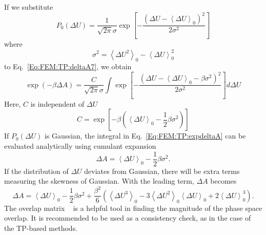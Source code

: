 If we substitute
\begin{equation}
P_{0}(\Delta U) = \frac{1}{\sqrt{2\pi}\sigma}\exp{\left[-\frac{(\Delta U - \left \langle \Delta U \right \rangle_{0})^2}{2\sigma^2}\right]}
\label{Eq:FEM:TP:gaussian}
\end{equation}
where
\begin{equation}
\sigma^2 = \left \langle \Delta U^2 \right \rangle_{0} - \left \langle \Delta U \right \rangle_{0}^2
\label{Eq:FEM:TP:variance}
\end{equation}
to Eq.~\ref{Eq:FEM:TP:deltaA7}, we obtain
\begin{equation}
\exp(-\beta \Delta A) = \frac{C}{\sqrt{2\pi}\sigma} \int \exp{\left[-\frac{(\Delta U - \left \langle \Delta U \right \rangle_{0} - \beta \sigma ^2)^2}{2\sigma^2}\right]} d\Delta U
\label{Eq:FEM:TP:expdeltaA}
\end{equation}
Here, $C$ is independent of $\Delta U$
\begin{equation}
C = \exp{\left[-\beta (\left \langle \Delta U \right \rangle_{0} - \frac{1}{2} \beta \sigma ^2)\right]}
\label{Eq:FEM:TP:C}
\end{equation}
If $P_{0}(\Delta U)$ is Gaussian, the integral in Eq.~\ref{Eq:FEM:TP:expdeltaA} can be evaluated analytically using cumulant expansion
\begin{equation}
\Delta A = \left< \Delta U \right>_{0} - \frac{1}{2} \beta \sigma ^2.
\label{Eq:FEM:TP:deltaA8}
\end{equation}
If the distribution of $\Delta U$ deviates from Gaussian, there will be extra terms measuring the skewness of Gaussian. With the leading term, $\Delta A$ becomes
\begin{equation}
\Delta A = \left< \Delta U \right>_{0} - \frac{1}{2} \beta \sigma ^2 + \frac{\beta^2}{6} \left(\left<\Delta U^3\right>_0-3\left<\Delta U^2\right>_0\left<\Delta U\right>_0+2\left<\Delta U\right>_0^3\right).
\label{Eq:FEM:TP:deltaA9}
\end{equation}
The overlap matrix ~\cite{KlimovichJCAMD2015} is a helpful tool in finding the magnitude of the phase space overlap. It is recommended to be used as a consistency check, as in the case of the TP-based methods.
 
